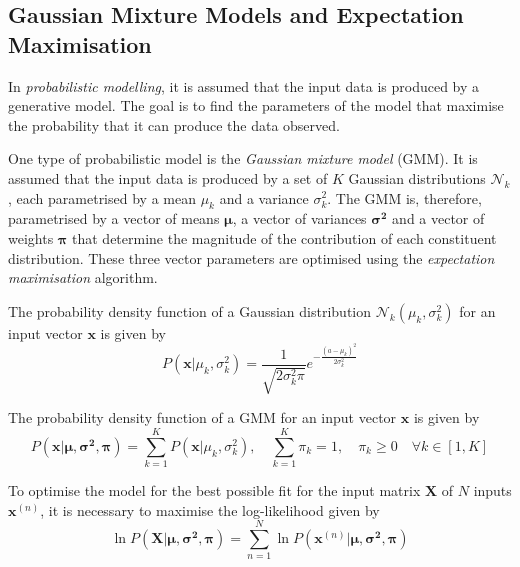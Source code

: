 \subsection{Gaussian Mixture Models and Expectation Maximisation}

In \emph{probabilistic modelling}, it is assumed that the input data is produced by a generative model.
The goal is to find the parameters of the model that maximise the probability that it can produce the data observed.

One type of probabilistic model is the \emph{Gaussian mixture model} (GMM).
It is assumed that the input data is produced by a set of \( K \) Gaussian distributions \( \mathcal{N}_{k} \), each parametrised by a mean \( \mu_{k} \) and a variance \( \sigma_{k}^{2} \).
The GMM is, therefore, parametrised by a vector of means \( \boldsymbol{\mu} \), a vector of variances \( \boldsymbol{\sigma^{2}} \) and a vector of weights \( \boldsymbol{\pi} \) that determine the magnitude of the contribution of each constituent distribution.
These three vector parameters are optimised using the \emph{expectation maximisation} algorithm.

The probability density function of a Gaussian distribution \( \mathcal{N}_{k}\!\left( \mu_{k}, \sigma_{k}^{2} \right) \) for an input vector \( \boldsymbol{x} \) is given by
\begin{equation*}
  P\!\left(\boldsymbol{x} \vert \mu_{k}, \sigma_{k}^{2}\right) = \frac{1}{\sqrt{2 \sigma_{k}^{2} \pi}} e^{- \frac{\left( a - \mu_{k} \right)^{2}}{2 \sigma_{k}^{2}}}
\end{equation*}

The probability density function of a GMM for an input vector \( \boldsymbol{x} \) is given by
\begin{equation*}
  P\!\left(\boldsymbol{x} \vert \boldsymbol{\mu}, \boldsymbol{\sigma^{2}}, \boldsymbol{\pi}\right) = \sum_{k=1}^{K} P\!\left(\boldsymbol{x} \vert \mu_{k}, \sigma_{k}^{2}\right), \quad \sum_{k=1}^{K} \pi_{k} = 1, \quad \pi_{k} \geq 0 \quad \forall k \in \left[ 1, K \right]
\end{equation*}

To optimise the model for the best possible fit for the input matrix \( \mathbf{X} \) of \( N \) inputs \( \boldsymbol{x}^{(n)} \), it is necessary to maximise the log-likelihood given by
\begin{equation*}
  \ln P\!\left(\mathbf{X} \vert \boldsymbol{\mu}, \boldsymbol{\sigma^{2}}, \boldsymbol{\pi}\right) = \sum_{n=1}^{N} \ln P\!\left(\boldsymbol{x}^{(n)} \vert \boldsymbol{\mu}, \boldsymbol{\sigma^{2}}, \boldsymbol{\pi}\right)
\end{equation*}

